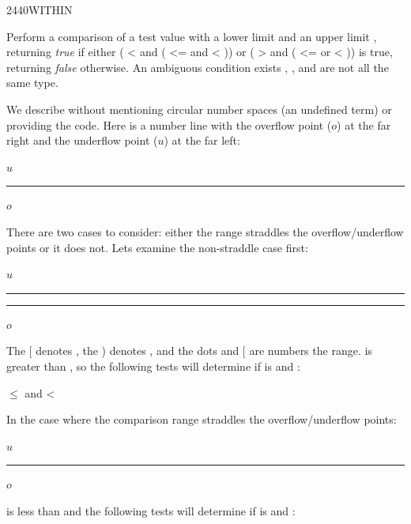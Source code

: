 \begin{worddef}{2440}{WITHIN}
\item {}

	Perform a comparison of a test value  with a
	lower limit  and an upper limit
	, returning \emph{true} if either
	( <   and
	( <=  and
	  <  )) or
	( >   and
	( <=  or
	  <  )) is true, returning
	\emph{false} otherwise. An ambiguous condition exists
	, , and  are not
	all the same type.

	\begin{rationale} %
		We describe  without mentioning circular number
		spaces (an undefined term) or providing the code. Here is a
		number line with the overflow point ($o$) at the far right and
		the underflow point ($u$) at the far left:
		\begin{center}
			$u$ \rule[.5ex]{15em}{.4pt} $o$
		\end{center}
		There are two cases to consider: either the
		 range straddles the overflow/underflow
		points or it does not. Lets examine the non-straddle case
		first:
		\begin{center}
			$u$ \rule[.5ex]{5em}{.4pt} \makebox[5em]{[\dotfill)} \rule[.5ex]{5em}{.4pt} $o$
		\end{center}
		The [ denotes , the ) denotes ,
		and the dots and [ are numbers  the range.
		 is greater than , so the
		following tests will determine if  is
		  and :
		\begin{center}
			 $\le$  and  < 
		\end{center}
		In the case where the comparison range straddles the
		overflow/underflow points:
		\begin{center}
			$u$\makebox[5em]{\dotfill)} \rule[.5ex]{5em}{.4pt} \makebox[5em]{[\dotfill}$o$
		\end{center}
		 is less than  and the following
		tests will determine if  is 
		 and :
		\begin{center}

\end{center}
\end{rationale}
\end{worddef}
